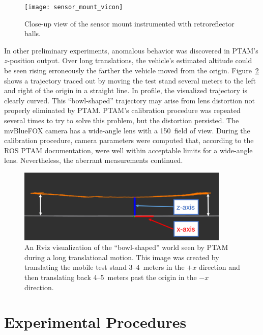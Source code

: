 \begin{figure}
  \centering
    \texttt{[image: sensor\_mount\_vicon]}
  \caption[Sensor Mount Instrumented with Retroreflectors]{Close-up view of the sensor mount instrumented with retroreflector balls.}
  \label{fig:sensor_mount_vicon}
\end{figure}

In other preliminary experiments, anomalous behavior was discovered in PTAM's $z$-position output. Over long translations, the vehicle's estimated altitude could be seen rising erroneously the farther the vehicle moved from the origin. Figure~\ref{fig:bowl-shaped_world} shows a trajectory traced out by moving the test stand several meters to the left and right of the origin in a straight line. In profile, the visualized trajectory is clearly curved. This ``bowl-shaped'' trajectory may arise from lens distortion not properly eliminated by PTAM. PTAM's calibration procedure was repeated several times to try to solve this problem, but the distortion persisted. The mvBlueFOX camera has a wide-angle lens with a 150\textdegree\ field of view. During the calibration procedure, camera parameters were computed that, according to the ROS PTAM documentation, were well within acceptable limits for a wide-angle lens. Nevertheless, the aberrant measurements continued.

\begin{figure}[b!]
  \centering
    \includegraphics[width=0.9\textwidth]{bowl-shaped_world}
  \caption[Rviz Visualization of Translational (Lens) Distortion]{An Rviz visualization of the ``bowl-shaped'' world seen by PTAM during a long translational motion. This image was created by translating the mobile test stand 3--4~meters in the $+x$ direction and then translating back 4--5~meters past the origin in the $-x$ direction.}
  \label{fig:bowl-shaped_world}
\end{figure}

\section{Experimental Procedures}

